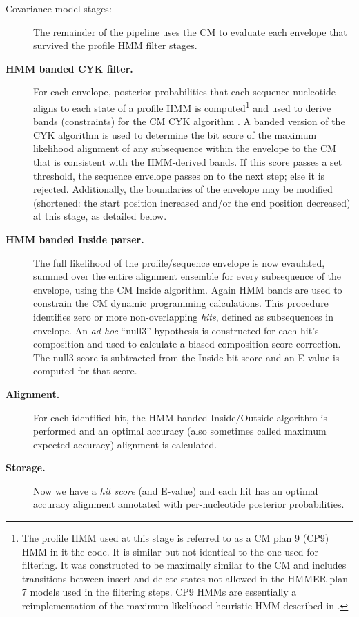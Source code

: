 \begin{description}
\begin{description}
\end{description}

\item[Covariance model stages:] The remainder of the pipeline uses the
  CM to evaluate each envelope that survived the profile HMM filter
  stages.

\item[\textbf{HMM banded CYK filter.}] For each envelope, posterior
  probabilities that each sequence nucleotide aligns to each state of a
  profile HMM is computed\footnote{The profile HMM used at this stage
  is referred to as a CM plan 9 (CP9) HMM in it the code. It is
  similar but not identical to the one used for filtering. It was
  constructed to be maximally similar to the CM and includes
  transitions between insert and delete states not allowed in the
  HMMER plan 7 models used in the filtering steps. CP9 HMMs are
  essentially a reimplementation of the maximum likelihood heuristic
  HMM described in \cite{WeinbergRuzzo06}.} and used to derive bands
  (constraints) for the CM CYK algorithm \cite{Brown00,
  Nawrocki09}. A banded version of the CYK algorithm is used to
  determine the bit score of the maximum likelihood alignment of any
  subsequence within the envelope to the CM that is consistent with
  the HMM-derived bands. If this score passes a set threshold, the
  sequence envelope passes on to the next step; else it is rejected. 
  Additionally, the boundaries of the envelope may be modified
  (shortened: the start position increased and/or the end position
  decreased) at this stage, as detailed below.

\item[\textbf{HMM banded Inside parser.}] The full likelihood of the
  profile/sequence envelope is now evaulated, summed over the entire
  alignment ensemble for every subsequence of the envelope, using the
  CM Inside algorithm. Again HMM bands are used to constrain the
  CM dynamic programming calculations. This procedure identifies zero
  or more non-overlapping \emph{hits}, defined as subsequences in
  envelope. An \emph{ad hoc} ``null3'' hypothesis is constructed for
  each hit's composition and used to calculate a biased composition
  score correction. The null3 score is subtracted from the Inside bit
  score and an E-value is computed for that score.

\item[\textbf{Alignment.}] For each identified hit, the HMM banded
  Inside/Outside algorithm is performed and an optimal accuracy (also
  sometimes called maximum expected accuracy) alignment is
  calculated. 

\item[\textbf{Storage.}] Now we have a \emph{hit score} (and E-value)
  and each hit has an optimal accuracy alignment annotated with
  per-nucleotide posterior probabilities.

\end{description}

